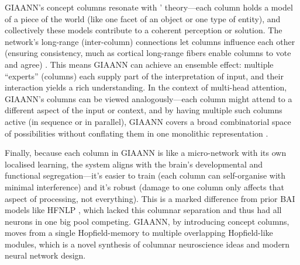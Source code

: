 GIAANN’s concept columns resonate with \citeauthor{hawkins2011htm}’ theory---each column holds a model of a piece of the world (like one facet of an object or one type of entity), and collectively these models contribute to a coherent perception or solution.
The network’s long-range (inter-column) connections let columns influence each other (ensuring consistency, much as cortical long-range fibers enable columns to vote and agree) \citep{hawkins2011htm}.
This means GIAANN can achieve an ensemble effect: multiple ``experts'' (columns) each supply part of the interpretation of input, and their interaction yields a rich understanding.
In the context of multi-head attention, GIAANN’s columns can be viewed analogously---each column might attend to a different aspect of the input or context, and by having multiple such columns active (in sequence or in parallel), GIAANN covers a broad combinatorial space of possibilities without conflating them in one monolithic representation \citep{vaswani2017attention}.

Finally, because each column in GIAANN is like a micro-network with its own localised learning, the system aligns with the brain’s developmental and functional segregation---it’s easier to train (each column can self-organise with minimal interference) and it’s robust (damage to one column only affects that aspect of processing, not everything).
This is a marked difference from prior BAI models like HFNLP \citep{bairesearch2024HFNLPpy}, which lacked this columnar separation and thus had all neurons in one big pool competing.
GIAANN, by introducing concept columns, moves from a single Hopfield-memory to multiple overlapping Hopfield-like modules, which is a novel synthesis of columnar neuroscience ideas and modern neural network design.
